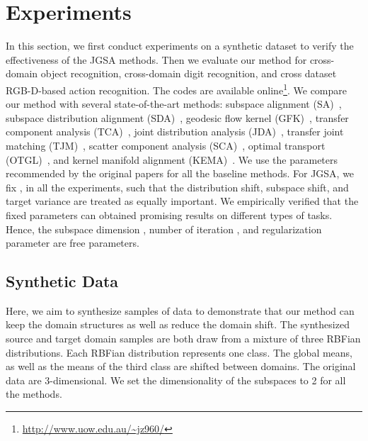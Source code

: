\documentclass[10pt,twocolumn,letterpaper]{article}
\begin{document}
\section{Experiments}
In this section, we first conduct experiments on a synthetic dataset to verify the effectiveness of the JGSA methods. Then we evaluate our method for cross-domain object recognition, cross-domain digit recognition, and cross dataset RGB-D-based action recognition. The codes are available online\footnote{\url{http://www.uow.edu.au/~jz960/}}. We compare our method with several state-of-the-art methods: subspace alignment (SA)~\cite{Fernando2013}, subspace distribution alignment (SDA)~\cite{Sun2015}, geodesic flow kernel (GFK)~\cite{Gong2012}, transfer component analysis (TCA)~\cite{Pan2011}, joint distribution analysis (JDA)~\cite{Long2013}, transfer joint matching (TJM)~\cite{Long2014}, 
scatter component analysis (SCA)~\cite{Ghifary2016}, optimal transport (OTGL)~\cite{Courty2016}, and kernel manifold alignment (KEMA)~\cite{Tuia2016}. We use the parameters recommended by the original papers for all the baseline methods. For JGSA, we fix ,  in all the experiments, such that the distribution shift, subspace shift, and target variance are treated as equally important. We empirically verified that the fixed parameters can obtained promising results on different types of tasks. Hence, the subspace dimension , number of iteration , and regularization parameter  are free parameters.
\subsection{Synthetic Data}
\label{sec:synthetic}
Here, we aim to synthesize samples of data to demonstrate that our method can keep the domain structures as well as reduce the domain shift. The synthesized source and target domain samples are both draw from a mixture of three RBFian distributions. Each RBFian distribution represents one class. The global means, as well as the means of the third class are shifted between domains. The original data are 3-dimensional. We set the dimensionality of the subspaces to 2 for all the methods. 
\end{document}
